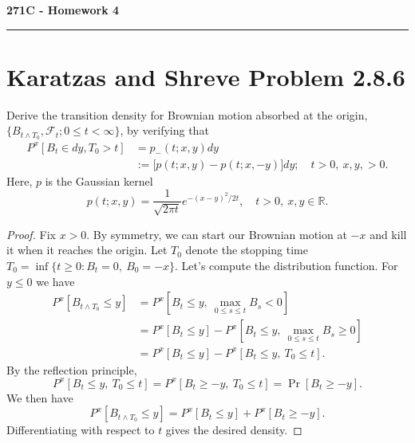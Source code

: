 \documentclass[11pt,letterpaper]{report}
\newcommand{\reals}{\mathbb{R}}
\newcommand{\mcal}[1]{\mathcal{#1}}
\begin{document}
\begin{center}
{\bf \Large 271C - Homework 4}
\vspace{0.2cm}
\hrule
\end{center}

\section*{Karatzas and Shreve Problem 2.8.6}
Derive the transition density for Brownian motion absorbed at the origin, $\{B_{t\land T_0}, \mcal{F}_t; 0\leq t<\infty\}$, by verifying that
\begin{align*}
P^x[B_t\in dy, T_0>t] &= p_-(t;x,y)dy\\
&:= \big[p(t;x,y)-p(t;x,-y)\big]dy;\quad t>0,\ x,y,>0.
\end{align*}
Here, $p$ is the Gaussian kernel
\[
p(t; x,y) = \frac{1}{\sqrt{2\pi t}}e^{-(x-y)^2/2t},\quad t>0,\ x,y\in \reals.
\]
\begin{proof}
	Fix $x>0$. By symmetry, we can start our Brownian motion at $-x$ and kill it when it reaches the origin. Let $T_0$ denote the stopping time $T_0 = \inf\{t\geq 0: B_t = 0,\ B_0 = -x\}$.  Let's compute the distribution function. For $y\leq 0$ we have
	\begin{align*}
		P^x[B_{t\land T_0} \leq y] &= P^x\left[B_t \leq y,\ \max_{0\leq s\leq t}B_s <0 \right]\\
		&= P^x[B_t\leq y] - P^x\left[B_t\leq y,\ \max_{0\leq s\leq t}B_s\geq 0\right]\\
		&= P^x[B_t\leq y] - P^x[B_t\leq y,\ T_0 \leq t].
	\end{align*}
	By the reflection principle,
	\[
	P^x[B_t\leq y,\ T_0\leq t] = P^x[B_t \geq -y,\ T_0\leq t] = \Pr[B_t\geq -y].
	\]
	We then have 
	\[
	P^x[B_{t\land T_0} \leq y]= P^x[B_t\leq y] + P^x[B_t\geq -y].
	\]
	Differentiating with respect to $t$ gives the desired density.
\end{proof}
\end{document}
